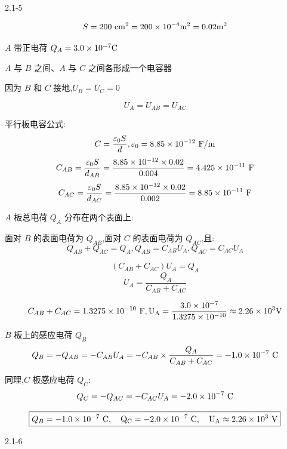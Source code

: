 \documentclass{article}
\begin{document}
2.1-5 %


$$ S = 200\ \rm{cm}^2 = 200 \times 10^{-4} \rm{m}^2 = 0.02\rm{m}^2 $$

$ A $ 带正电荷 $ Q_A = 3.0 \times 10^{-7} \rm{C} $

$ A $ 与 $ B $ 之间、$ A $ 与 $ C $ 之间各形成一个电容器

因为 $ B $ 和 $ C $ 接地,$U_B=U_C=0$

$$U_A = U_{AB} = U_{AC}$$

平行板电容公式:
$$C = \frac{\varepsilon_0 S}{d},\varepsilon_0 = 8.85 \times 10^{-12} \ \rm{F/m}$$
$$C_{AB} = \frac{\varepsilon_0 S}{d_{AB}} = \frac{8.85\times 10^{-12} \times 0.02}{0.004}= 4.425\times 10^{-11} \ \rm{F}$$
$$C_{AC} = \frac{\varepsilon_0 S}{d_{AC}} = \frac{8.85\times 10^{-12} \times 0.02}{0.002}= 8.85\times 10^{-11} \ \rm{F}$$


$ A $ 板总电荷 $ Q_A $ 分布在两个表面上:  

面对 $ B $ 的表面电荷为 $ Q_{AB} $,面对 $ C $ 的表面电荷为 $ Q_{AC} $,且:
$$Q_{AB} + Q_{AC} = Q_A ,Q_{AB} = C_{AB} U_A, Q_{AC} = C_{AC} U_A$$

$$(C_{AB} + C_{AC}) U_A = Q_A$$
$$U_A = \frac{Q_A}{C_{AB} + C_{AC}}$$


$$C_{AB} + C_{AC} = 1.3275\times 10^{-10} \ \rm{F},U_A = \frac{3.0\times 10^{-7}}{1.3275\times 10^{-10}} \approx 2.26\times 10^{3} \rm{V}$$

$ B $ 板上的感应电荷 $ Q_B $
$$Q_B = - Q_{AB} = - C_{AB} U_A= - C_{AB}\times \frac{Q_A}{C_{AB} + C_{AC}}  =- 1.0\times 10^{-7} \ \rm{C}$$

同理,$ C $ 板感应电荷 $ Q_C $:
$$Q_C = - Q_{AC} = - C_{AC} U_A = -2.0\times 10^{-7} \ \rm{C}$$

$$\boxed{Q_B = -1.0\times 10^{-7}\ \rm{C},\quad Q_C = -2.0\times 10^{-7}\ \rm{C},\quad U_A \approx 2.26\times 10^{3}\ \rm{V}}$$

















\newpage

2.1-6 %
\end{document}
